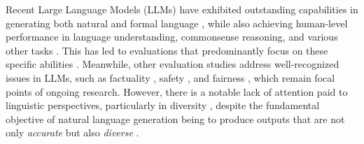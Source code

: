 \documentclass[11pt,a4paper]{article}
\begin{document}
Recent Large Language Models (LLMs) have exhibited outstanding capabilities in generating both natural and formal language \citep{brown2020language, touvron2023llama}, while also achieving human-level performance in language understanding, commonsense reasoning, and various other tasks \citep{hendrycks2020measuring}. This has led to evaluations that predominantly focus on these specific abilities \citep{wang2024mmlu}. Meanwhile, other evaluation studies address well-recognized issues in LLMs, such as factuality \citep{maynez-etal-2020-faithfulness}, safety \citep{zhang-etal-2024-safetybench}, and fairness \citep{gallegos-etal-2024-bias}, which remain focal points of ongoing research.
However, there is a notable lack of attention paid to linguistic perspectives, particularly in diversity \citep{guo-etal-2024-curious}, despite the fundamental objective of natural language generation being to produce outputs that are not only \textit{accurate} but also \textit{diverse} \citep{tevet-berant-2021-evaluating}.


\end{document}

